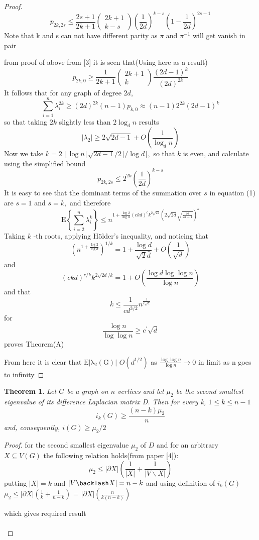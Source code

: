 \documentclass[oneside]{book}
\newtheorem{theorem}{Theorem}[section]
\begin{document}
\begin{proof}
$$
p_{2 k, 2 s} \leq \frac{2 s+1}{2 k+1}\left(\begin{array}{c}
2 k+1 \\
k-s
\end{array}\right)\left(\frac{1}{2 d}\right)^{k-s}\left(1-\frac{1}{2 d}\right)^{2 s-1}
$$
 Note that k and s can not have different parity as  $\pi$ and $\pi^{-1}$ will get vanish in pair\par
   from proof of above from [3] it is seen that(Using here as a result)  
$$ p_{2 k, 0} \geq \frac{1}{2 k+1}\left(\begin{array}{c}
2 k+1 \\
k
\end{array}\right) \frac{(2 d-1)^{k}}{(2 d)^{2 k}}$$
It follows that for any graph of degree $2 d$,
$$
\sum_{i=1}^{n} \lambda_{i}^{2 k} \geq(2 d)^{2 k}(n-1) p_{k, 0} \approx(n-1) 2^{2 k}(2 d-1)^{k}
$$
so that taking $2 k$ slightly less than $2 \log _{d} n$ results 
$$
\left|\lambda_{2}\right| \geq 2 \sqrt{2 d-1}+O\left(\frac{1}{\log _{d} n}\right)
$$
Now we take $k=2$ $\lfloor\log n\lfloor\sqrt{2 d-1} / 2\rfloor / \log d\rfloor,$ so that $k$ is even, and calculate
using the simplified bound
$$
p_{2 k, 2 s} \leq 2^{2 k}\left(\frac{1}{2 d}\right)^{k-s}
$$
It is easy to see that the dominant terms of the summation over $s$ in equation (1) are $s=1$ and $s=k,$ and therefore
$$
\mathrm{E}\left\{\sum_{i=2}^{n} \lambda_{i}^{k}\right\} \leq n^{1+\frac{\log 2}{\log \alpha}(c k d)^{c} k^{2 \sqrt{2 d}}(2 \sqrt{2 d} \sqrt{\frac{2 d}{2 d-1}})^{k}}
$$
Taking $k$ -th roots, applying Hölder's  inequality, and noticing that
$$
\left(n^{1+\frac{\log 2}{\log d}}\right)^{1 / k}=1+\frac{\log d}{\sqrt{2} \bar{d}}+O\left(\frac{1}{\sqrt{d}}\right)
$$
and 
$$
(c k d)^{c / k} k^{2 \sqrt{2 d} / k}=1+O\left(\frac{\log d \log \log n}{\log n}\right)
$$
and that
$$
k \leq \frac{1}{c d^{3 / 2}} n^{\frac{1}{c \sqrt{a}}}
$$
for
$$
\frac{\log n}{\log \log n} \geq c^{\prime} \sqrt{d}
$$
proves Theorem(A)  \par 
From here it is clear that $\mathrm{E|\lambda_{2}(G)|}$ \leq $O(d^{1/2})$ as $\frac{ \log \log n}{\log n}\rightarrow 0$ in limit  as n goes to  infinity 
\end{proof} 
\begin{theorem} 
 Let $G$ be a graph on $n$ vertices and let $\mu_{2}$ be the second smallest eigenvalue of its difference Laplacian matrix D. Then for every k, 
$1 \leq k \leq n-1$
$$
i_{k}(G) \geq \frac{(n-k) \mu_{2}}{n}
$$
and, consequently, $i(G) \geq \mu_{2} / 2$ \par
\end{theorem} 
\begin{proof}
for the second smallest eigenvalue $\mu_{2}$ of $D$ and for an arbitrary $X \subseteq V(G)$ the following relation holds(from paper [4]):
$$
\mu_{2} \leq|\partial X|\left(\frac{1}{|X|}+\frac{1}{|V \backslash X|}\right)
$$
putting $|X| = k $ and $|V\backlash X| = n-k $ and using definition of $i_k(G)$ 
 $ \mu_{2} \leq|\partial X|\left(\frac{1}{k}+\frac{1}{n-k}\right)$ = $|\partial X|\left(\frac{n}{k(n-k)}\right) $ \par
 which gives required result\\\\
 \end{proof} 
 
\end{document}
